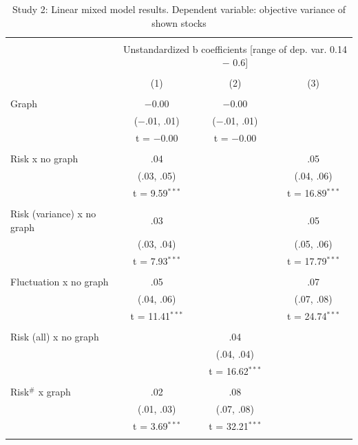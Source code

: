 \begin{table}[!htbp] \centering \small
 \caption{Study 2: Linear mixed model results. Dependent variable: objective variance of shown stocks} 
 \label{table:supplement_tab1} 
\begin{tabular}{@{\extracolsep{5pt}}lccc} 
\\[-1.8ex]\hline 
\hline \\[-1.8ex] 
 & \multicolumn{3}{c}{Unstandardized b coefficients [range of dep. var. 0.14 $-$ 0.6]} \\ 
\cline{2-4} 
\\[-1.8ex] & (1) & (2) & (3)\\ 
\hline \\[-1.8ex] 
 Graph & $-$0.00 & $-$0.00 & \\ 
 & ($-$.01, .01) & ($-$.01, .01) & \\ 
 & t = $-$0.00 & t = $-$0.00 & \\ 
 & & & \\ \midrule
 Risk x no graph & .04 & & .05 \\ 
 & (.03, .05) & & (.04, .06) \\ 
 & t = 9.59$^{***}$ & & t = 16.89$^{***}$ \\ 
 & & & \\ 
 Risk (variance) x no graph & .03 & & .05 \\ 
 & (.03, .04) & & (.05, .06) \\ 
 & t = 7.93$^{***}$ & & t = 17.79$^{***}$ \\ 
 & & & \\ 
 Fluctuation x no graph & .05 & & .07 \\ 
 & (.04, .06) & & (.07, .08) \\ 
 & t = 11.41$^{***}$ & & t = 24.74$^{***}$ \\ 
 & & & \\ 
 Risk (all) x no graph & & .04 & \\ 
 & & (.04, .04) & \\ 
 & & t = 16.62$^{***}$ & \\ 
 & & & \\ \midrule
 Risk$^{\#}$ x graph & .02 & .08 & \\ 
 & (.01, .03) & (.07, .08) & \\ 
 & t = 3.69$^{***}$ & t = 32.21$^{***}$ & \\ 
 & & & \\ 

\end{tabular}
\end{table}
